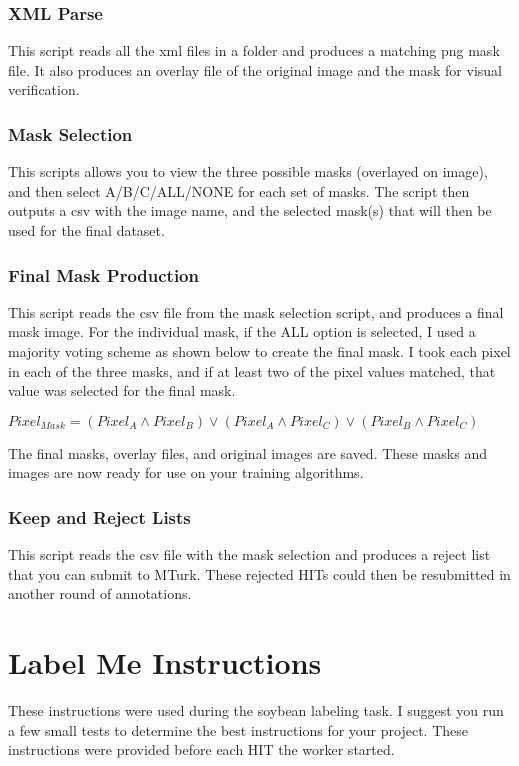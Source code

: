 \documentclass[a4paper]{article}
\begin{document}
\subsubsection{XML Parse}
This script reads all the xml files in a folder and produces a matching png mask file. It also produces an overlay file of the original image and the mask for visual verification. 

\subsubsection{Mask Selection}

This scripts allows you to view the three possible masks (overlayed on image), and then select A/B/C/ALL/NONE for each set of masks. The script then outputs a csv with the image name, and the selected mask(s) that will then be used for the final dataset. 

\subsubsection{Final Mask Production}

This script reads the csv file from the mask selection script, and produces a final mask image. For the individual mask, if the ALL option is selected, I used a majority voting scheme as shown below to create the final mask. I took each pixel in each of the three masks, and if at least two of the pixel values matched, that value was selected for the final mask. 

\bigskip

$Pixel_{Mask} = (Pixel_A \wedge Pixel_B) \lor (Pixel_A \wedge Pixel_C) \lor (Pixel_B \wedge Pixel_C) $

\bigskip

The final masks, overlay files, and original images are saved. These masks and images are now ready for use on your training algorithms. 

\subsubsection{Keep and Reject Lists}
This script reads the csv file with the mask selection and produces a reject list that you can submit to MTurk. These rejected HITs could then be resubmitted in another round of annotations.  



\newpage
\section{Label Me Instructions }
\label{instructions}
These instructions were used during the soybean labeling task. I suggest you run a few small tests to determine the best instructions for your project. These instructions were provided before each HIT the worker started. 

\end{document}
